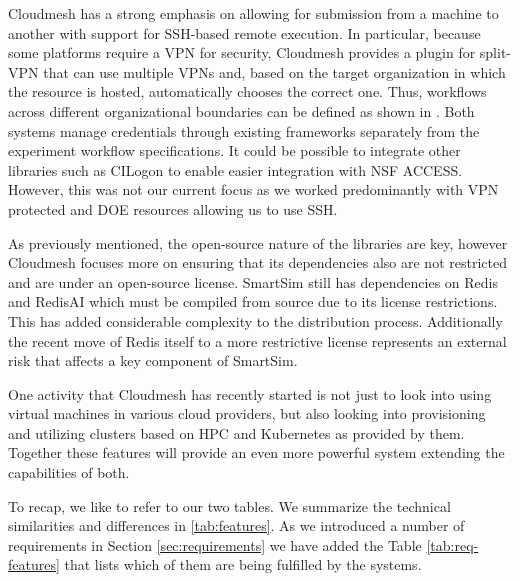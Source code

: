 \documentclass[sigconf]{acmart}
\begin{document}
Cloudmesh has a strong emphasis on allowing for submission from a machine to another with support for SSH-based remote execution. In particular, because some platforms require a VPN for security, Cloudmesh provides a plugin for split-VPN that can use multiple VPNs and, based on the target organization in which the resource is hosted, automatically chooses the correct one. Thus, workflows across different organizational boundaries can be defined as shown in \citep{las-frontiers-edu}. Both systems manage credentials through existing frameworks separately from the experiment workflow specifications. It could be possible to integrate other libraries such as CILogon to enable easier integration with NSF ACCESS. However, this was not our current focus as we worked predominantly with VPN protected and DOE resources allowing us to use SSH. 

As previously mentioned, the open-source nature of the libraries are key, however Cloudmesh focuses more on ensuring that its dependencies also are not restricted and are under an open-source license. SmartSim still has dependencies on Redis and RedisAI which must be compiled from source due to its license restrictions. This has added considerable complexity to the distribution process. Additionally the recent move of Redis itself to a more restrictive license represents an external risk that affects a key component of SmartSim.

One activity that Cloudmesh has recently started is not just to look into using virtual machines in various cloud providers, but also looking into provisioning and utilizing clusters based on HPC and Kubernetes as provided by them. Together these features will provide an even more powerful system extending the capabilities of both. 

To recap, we like to refer to our two tables. We summarize the technical similarities and differences in \ref{tab:features}. As we introduced a number of requirements in Section \ref{sec:requirements} we have added the Table \ref{tab:req-features} that lists which of them are being fulfilled by the systems.
\end{document}
